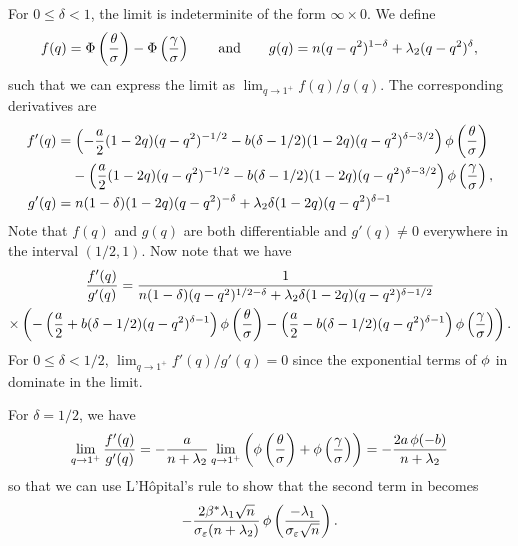 For \(0 \leq \delta < 1\), the limit is indeterminite of the form \(\infty \times 0\). We
define
\[
  f(q) = \operatorname{\Phi} \left(\frac{\theta}{\sigma}\right) - \operatorname{\Phi} \left(\frac{\gamma}{\sigma}\right)
  \qquad\text{and}\qquad
  g(q) = n(q - q^2)^{1-\delta} + \lambda_2(q - q^2)^\delta,
\]
such that we can express the limit as \(\lim_{q \rightarrow 1^+}f(q)/g(q)\). The
corresponding derivatives are
\[
  \begin{aligned}
    f'(q) & = \left(-\frac{a}{2}(1-2q)(q - q^2)^{-1/2} - b(\delta - 1/2)(1-2q)(q - q^2)^{\delta - 3/2}\right)\pdf\left(\frac{\theta}{\sigma}\right)                \\
          & \phantom{= {}} - \left(\frac{a}{2}(1-2q)(q - q^2)^{-1/2} - b(\delta - 1/2)(1-2q)(q - q^2)^{\delta - 3/2}\right)\pdf\left(\frac{\gamma}{\sigma}\right), \\
    g'(q) & = n(1 - \delta)(1-2q)(q - q^2)^{-\delta} + \lambda_2 \delta(1 - 2q) (q - q^2)^{\delta - 1}
  \end{aligned}
\]
Note that \(f(q)\) and \(g(q)\) are both differentiable and \(g'(q) \neq 0\) everywhere in
the interval \((1/2, 1)\). Now note that we have
\begin{multline}
  \label{eq:eval-qlimit-secondterm}
  \frac{f'(q)}{g'(q)} = \frac{1}{n(1-\delta)(q-q^2)^{1/2-\delta} + \lambda_2 \delta (1-2q)(q - q^2)^{\delta-1/2}} \\
  \times \left(-\left(\frac{a}{2} + b(\delta - 1/2)(q - q^2)^{\delta - 1}\right)\operatorname{\phi}\left(\frac{\theta}{\sigma}\right) - \left(\frac{a}{2} - b(\delta - 1/2)(q - q^2)^{\delta - 1}\right)\operatorname{\phi}\left(\frac{\gamma}{\sigma}\right) \right).
\end{multline}
For \(0 \leq \delta < 1/2\), $\lim_{q \rightarrow 1^+}f'(q)/g'(q) = 0$ since the exponential terms of \(\operatorname{\phi}\) in  dominate in the limit.

For \(\delta = 1/2\), we have
\[
  \lim_{q \rightarrow 1^+} \frac{f'(q)}{g'(q)} = -\frac{a}{n + \lambda_2} \lim_{q \rightarrow 1^+}\left(\operatorname{\phi}\left(\frac{\theta}{\sigma}\right) + \operatorname{\phi}\left(\frac{\gamma}{\sigma}\right)\right) = -\frac{2a \operatorname{\phi}(-b)}{n + \lambda_2}
\]
so that we can use L'Hôpital's rule to show that the second term in
 becomes
\begin{equation}
  \label{eq:eval-qlimit-stdcase}
  -\frac{2\beta^*\lambda_1\sqrt{n}}{\sigma_\varepsilon(n + \lambda_2)} \operatorname{\phi}\left(\frac{-\lambda_1}{\sigma_\varepsilon\sqrt{n}}\right).
\end{equation}

